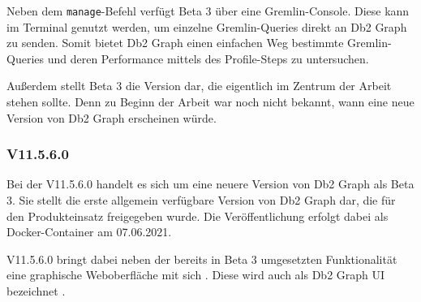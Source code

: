Neben dem \texttt{manage}-Befehl verfügt Beta 3 über eine Gremlin-Console. Diese kann im Terminal genutzt werden, um einzelne Gremlin-Queries direkt an Db2 Graph zu senden. Somit bietet Db2 Graph einen einfachen Weg bestimmte Gremlin-Queries und deren Performance mittels des Profile-Steps zu untersuchen.

Außerdem stellt Beta 3 die Version dar, die eigentlich im Zentrum der Arbeit stehen sollte. Denn zu Beginn der Arbeit war noch nicht bekannt, wann eine neue Version von Db2 Graph erscheinen würde. 

\subsubsection{V11.5.6.0}

Bei der V11.5.6.0 handelt es sich um eine neuere Version von Db2 Graph als Beta 3. Sie stellt die erste allgemein verfügbare Version von Db2 Graph dar, die für den Produkteinsatz freigegeben wurde. Die Veröffentlichung erfolgt dabei als Docker-Container am 07.06.2021. 

V11.5.6.0 bringt dabei neben der bereits in Beta 3 umgesetzten Funktionalität eine graphische Weboberfläche mit sich \cite{ibm_docs_db2_graph_ui}. Diese wird auch als Db2 Graph UI bezeichnet \cite{ibm_docs_db2_graph_ui}. 